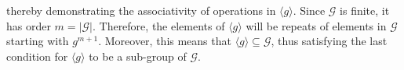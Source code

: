 \documentclass{article}[12]
\numberwithin{equation}{section}
\begin{document}
\begin{flushleft}
thereby demonstrating the associativity of operations in $\langle g \rangle$.  Since $\mathcal{G}$ is finite, it has order $m = \lvert \mathcal{G} \rvert$.  Therefore, the elements of $\langle g \rangle$ will be repeats of elements in $\mathcal{G}$ starting with $g^{m + 1}$.  Moreover, this means that $\langle g \rangle \subseteq \mathcal{G}$, thus satisfying the last condition for $\langle g \rangle$ to be a sub-group of $\mathcal{G}$.

















































\end{flushleft}
\end{document}
